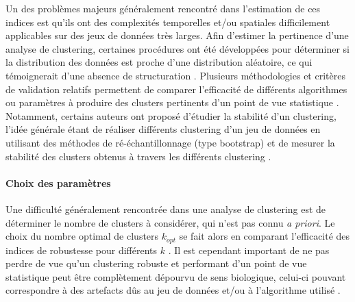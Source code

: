 Un des problèmes majeurs généralement rencontré dans l'estimation de ces indices est qu'ils ont des complexités temporelles et/ou spatiales difficilement applicables sur des jeux de données très larges. Afin d'estimer la pertinence d'une analyse de clustering, certaines procédures ont été développées pour déterminer si la distribution des données est proche d'une distribution aléatoire, ce qui témoignerait d'une absence de structuration \citep{gan2007data,han2012data}. Plusieurs méthodologies et critères de validation relatifs permettent de comparer l'efficacité de différents algorithmes ou paramètres à produire des clusters pertinents d'un point de vue statistique \citep{gan2007data,kovacs2005cluster}. Notamment, certains auteurs ont proposé d'étudier la stabilité d'un clustering, l'idée générale étant de réaliser différents clustering d'un jeu de données en utilisant des méthodes de ré-échantillonnage (type bootstrap) et de mesurer la stabilité des clusters obtenus à travers les différents clustering \citep{hennig2007cluster,Hennig2008,Fang2012}.

\paragraph{Choix des paramètres}
Une difficulté généralement rencontrée dans une analyse de clustering est de déterminer le nombre de clusters à considérer, qui n'est pas connu \textit{a priori}. Le choix du nombre optimal de clusters $k_{opt}$ se fait alors en comparant l'efficacité des indices de robustesse pour différents $k$ \citep{Tibshirani2005,rakhlin2007stability,Fang2012}. Il est cependant important de ne pas perdre de vue qu'un clustering robuste et performant d'un point de vue statistique peut être complètement dépourvu de sens biologique, celui-ci pouvant correspondre à des artefacts dûs au jeu de données et/ou à l'algorithme utilisé \citep{hennig2007cluster}.

